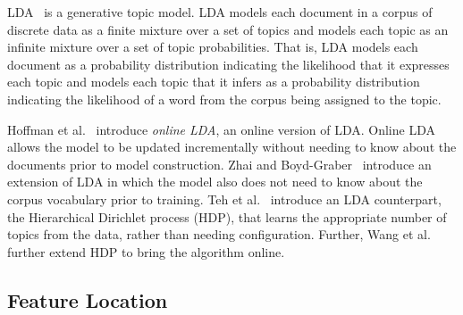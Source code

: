 LDA~\cite{Blei-etal:2003} is a generative topic model.
LDA models each document in a corpus of discrete data as a finite mixture over
a set of topics and models each topic as an infinite mixture over a set of
topic probabilities.  That is, LDA models each document as a probability
distribution indicating the likelihood that it expresses each topic and models
each topic that it infers as a probability distribution indicating the
likelihood of a word from the corpus being assigned to the topic.

Hoffman et al.~\cite{Hoffman-etal:2010} introduce \textit{online LDA}, an online version of LDA.
Online LDA allows the model to be updated incrementally without
needing to know about the documents prior to model construction.  Zhai and
Boyd-Graber~\cite{Zhai-Boyd-Graber:2013} introduce an extension of LDA in which
the model also does not need to know about the corpus vocabulary prior to
training. Teh et al.~\cite{Teh-etal:2006} introduce an LDA counterpart,
the Hierarchical Dirichlet process (HDP), that learns the appropriate number of
topics from the data, rather than needing configuration. Further, Wang et
al.~\cite{Wang-etal:2011} further extend HDP to bring the algorithm online.


\subsection{Feature Location}


